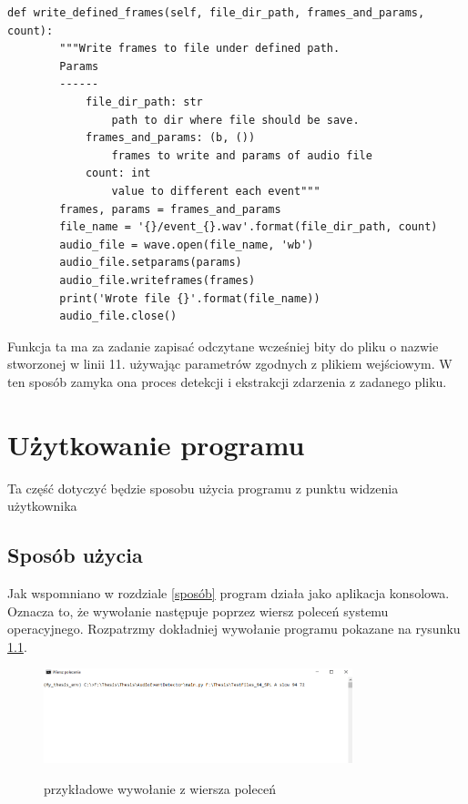 \documentclass[eng,printmode]{mgr}
\begin{document}
\begin{minipage}{\linewidth}
\begin{lstlisting}[caption={fragment kodu źródłowego pliku WaveReader.py,\newline klasa WaveWriter. metoda write\_defined\_frames },captionpos=b,label={writedefinedframes}] 
    def write_defined_frames(self, file_dir_path, frames_and_params, count):
        """Write frames to file under defined path.
        Params
        ------
            file_dir_path: str
                path to dir where file should be save.
            frames_and_params: (b, ())
                frames to write and params of audio file
            count: int
                value to different each event"""
        frames, params = frames_and_params
        file_name = '{}/event_{}.wav'.format(file_dir_path, count)
        audio_file = wave.open(file_name, 'wb')
        audio_file.setparams(params)
        audio_file.writeframes(frames)
        print('Wrote file {}'.format(file_name))
        audio_file.close()
\end{lstlisting}
\end{minipage}
Funkcja ta ma za zadanie zapisać odczytane wcześniej bity do pliku o nazwie stworzonej w linii 11. używając parametrów zgodnych z plikiem wejściowym. 
W ten sposób zamyka ona proces detekcji i ekstrakcji zdarzenia z zadanego pliku. 


\chapter{Użytkowanie programu} \label{uzytkowanie}
Ta część dotyczyć będzie sposobu użycia programu z punktu widzenia użytkownika
\section{Sposób użycia}
Jak wspomniano w rozdziale \ref{sposób} program działa jako aplikacja konsolowa. Oznacza to, że wywołanie następuje poprzez wiersz poleceń systemu operacyjnego. Rozpatrzmy dokładniej wywołanie programu pokazane na rysunku \ref{cmd}.

\begin{figure}[hbtp]
\caption{przykładowe wywołanie z wiersza poleceń}
\centering
\includegraphics[width=0.8\textwidth]{cmd_wywolanie_2.PNG}
\label{cmd}
\end{figure}
\end{document}
